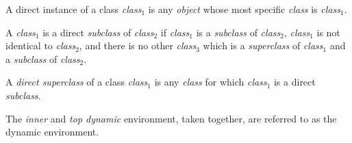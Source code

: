 \begin{optDefinition}
\begin{definitions}
     A direct instance of a class
    {\em class$_1$} is any {\em object} whose most specific {\em class} is {\em
        class$_1$}.


     A {\em class$_1$} is a direct
    {\em subclass} of {\em class$_2$} if {\em class$_1$} is a {\em subclass} of
    {\em class$_2$}, {\em class$_1$} is not identical to {\em class$_2$}, and
    there is no other {\em class$_3$} which is a {\em superclass} of {\em
        class$_1$} and a {\em subclass} of {\em class$_2$}.

     
     A {\em direct superclass} of a class {\em
        class$_1$} is any {\em class} for which {\em class$_1$} is a direct {\em
        subclass}.


     The
    {\em inner} and {\em top dynamic} environment, taken together, are referred
    to as the dynamic environment.


\end{definitions}
\end{optDefinition}
